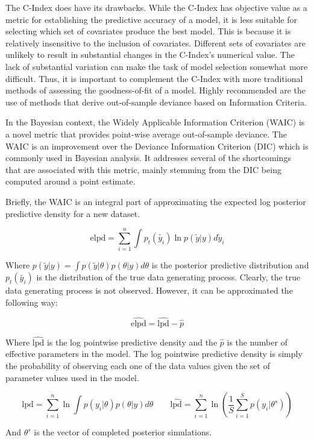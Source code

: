 The C-Index does have its drawbacks. While the C-Index has objective value as a metric for establishing the predictive accuracy of a model, it is less suitable for selecting which set of covariates produce the best model. This is because it is relatively insensitive to the inclusion of covariates\cite{Cook2007}. Different sets of covariates are unlikely to result in substantial changes in the C-Index's numerical value. The lack of substantial variation can make the task of model selection somewhat more difficult. Thus, it is important to complement the C-Index with more traditional methods of assessing the goodness-of-fit of a model. Highly recommended are the use of methods that derive out-of-sample deviance based on Information Criteria. 

In the Bayesian context, the Widely Applicable Information Criterion (WAIC) is a novel metric that provides point-wise average out-of-sample deviance\cite{Watanabe2010}. The WAIC is an improvement over the Deviance Information Criterion (DIC) which is commonly used in Bayesian analysis. It addresses several of the shortcomings that are associated with this metric, mainly stemming from the DIC being computed around a point estimate. 

Briefly, the WAIC is an integral part of approximating the expected log posterior predictive density for a new dataset\cite{Vehtari2015}. 

$$ \text{elpd} = \sum_{i=1}^n \int p_t(\tilde{y_i})\ln p(\tilde{y}|y) d\tilde{y}_i $$

Where $p(\tilde{y}|y) = \int p(\tilde{y}|\theta)p(\theta|y) d\theta$ is the posterior predictive distribution and $p_t(\tilde{y_i})$ is the distribution of the true data generating process. Clearly, the true data generating process is not observed. However, it can be approximated the following way:

$$\hat{\text{elpd}} = \hat{\text{lpd}} - \hat{p}$$

Where $\hat{\text{lpd}}$ is the log pointwise predictive density and the $\hat{p}$ is the number of effective parameters in the model. The log pointwise predictive density is simply the probability of observing each one of the data values given the set of parameter values used in the model.

$$ \text{lpd} = \sum_{i=1}^n \ln \int p(y_i|\theta)p(\theta|y) d\theta \qquad \hat{\text{lpd}} = \sum_{i=1}^n \ln\left ( \frac{1}{S} \sum_{i = 1}^S p(y_i|\theta^s)  \right ) $$

And $\theta^s$ is the vector of completed posterior simulations. 

